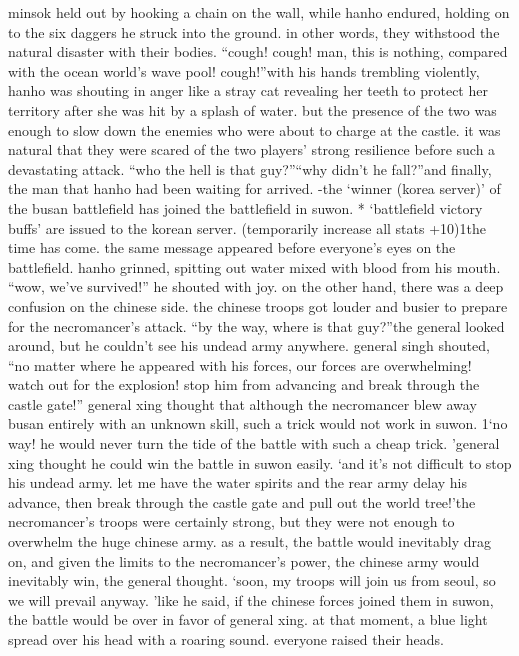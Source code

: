 minsok held out by hooking a chain on the wall, while hanho endured, holding on to the six daggers he struck into the ground.
 in other words, they withstood the natural disaster with their bodies.
“cough! cough! man, this is nothing, compared with the ocean world’s wave pool! cough!”with his hands trembling violently, hanho was shouting in anger like a stray cat revealing her teeth to protect her territory after she was hit by a splash of water.
but the presence of the two was enough to slow down the enemies who were about to charge at the castle.
 it was natural that they were scared of the two players’ strong resilience before such a devastating attack.
“who the hell is that guy?”“why didn’t he fall?”and finally, the man that hanho had been waiting for arrived.
-the ‘winner (korea server)’ of the busan battlefield has joined the battlefield in suwon.
* ‘battlefield victory buffs’ are issued to the korean server.
 (temporarily increase all stats +10)1the time has come.
the same message appeared before everyone’s eyes on the battlefield.
hanho grinned, spitting out water mixed with blood from his mouth.
“wow, we’ve survived!” he shouted with joy.
on the other hand, there was a deep confusion on the chinese side.
the chinese troops got louder and busier to prepare for the necromancer’s attack.
“by the way, where is that guy?”the general looked around, but he couldn’t see his undead army anywhere.
general singh shouted, “no matter where he appeared with his forces, our forces are overwhelming! watch out for the explosion! stop him from advancing and break through the castle gate!”
general xing thought that although the necromancer blew away busan entirely with an unknown skill, such a trick would not work in suwon.
1‘no way! he would never turn the tide of the battle with such a cheap trick.
’general xing thought he could win the battle in suwon easily.
‘and it’s not difficult to stop his undead army.
 let me have the water spirits and the rear army delay his advance, then break through the castle gate and pull out the world tree!’the necromancer’s troops were certainly strong, but they were not enough to overwhelm the huge chinese army.
 as a result, the battle would inevitably drag on, and given the limits to the necromancer’s power, the chinese army would inevitably win, the general thought.
‘soon, my troops will join us from seoul, so we will prevail anyway.
’like he said, if the chinese forces joined them in suwon, the battle would be over in favor of general xing.
at that moment, a blue light spread over his head with a roaring sound.
 everyone raised their heads.
